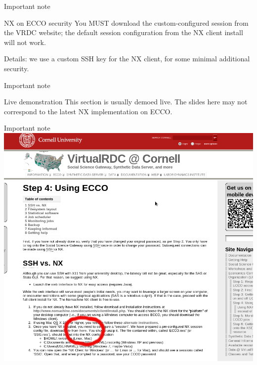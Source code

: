 \documentclass[xcolor=table,compress]{beamer}
\begin{document}
\begin{frame}{Important note}
\begin{block}{NX on ECCO security}
You MUST download the custom-configured session from the VRDC website; the default session 
configuration from the NX client install will not work.
\end{block}
\tiny Details: we use a custom SSH key for the NX client, for some minimal additional security.
\end{frame}

\begin{frame}{Important note}
\begin{block}{Live demonstration}
This section is usually demoed live. The slides here may not correspond to the latest NX 
implementation on ECCO.
\end{block}

\end{frame}

\begin{frame}{Important note}
\includegraphics[height=.7\textheight]{nx-ecco-key.png}
\end{frame}
\end{document}
